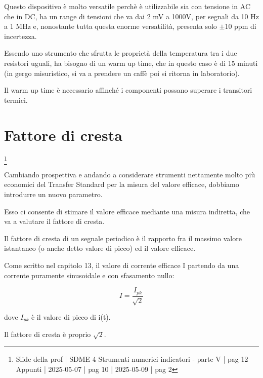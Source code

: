 Questo dispositivo è molto versatile perchè è utilizzabile sia con tensione in AC che in DC, ha un range di tensioni che va dai 2 mV a 1000V, 
per segnali da 10 Hz a 1 MHz e, nonostante tutta questa enorme versatilità, presenta solo $\pm 10$ ppm di incertezza. \newline 

Essendo uno strumento che sfrutta le proprietà della temperatura tra i due resistori uguali, ha bisogno di un warm up  time, che in questo caso è di 15 minuti 
(in gergo misuristico, si va a prendere un caffè poi si ritorna in laboratorio). \newline 

Il warm up time è necessario affinché i componenti possano superare i transitori termici. \newline 

\newpage 

\section{Fattore di cresta}
\footnote{Slide della prof | SDME 4 Strumenti numerici indicatori - parte V | pag 12\\  
Appunti | 2025-05-07 | pag 10 | 2025-05-09 | pag 2} 

Cambiando prospettiva e andando a considerare strumenti nettamente molto più economici del Transfer Standard per la misura del valore efficace, 
dobbiamo introdurre un nuovo parametro. \newline 

Esso ci consente di stimare il valore efficace mediante una misura indiretta, che va a valutare il fattore di cresta. \newline 

Il fattore di cresta di un segnale periodico è il rapporto fra il massimo valore istantaneo (o anche detto valore di picco) ed il valore efficace. \newline 

Come scritto nel capitolo 13, il valore di corrente efficace I  partendo da una corrente puramente sinusoidale e con sfasamento nullo: 

{
    \Large 
    \begin{equation}
        I = \frac{I_{pk}}{\sqrt{2}}
    \end{equation}
}

dove $I_{pk}$ è il valore di picco di i(t). \newline 

Il fattore di cresta è proprio $\sqrt{2}$. \newline 


